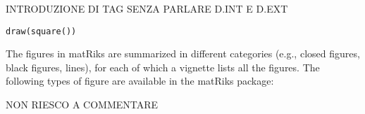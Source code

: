 INTRODUZIONE DI TAG SENZA PARLARE D.INT E D.EXT

\begin{verbatim}
draw(square())
\end{verbatim}


The figures in matRiks are summarized in different categories (e.g., closed figures, black figures, lines), for each of which a vignette lists all the figures.
The following types of figure are available in the matRiks package:


NON RIESCO A COMMENTARE

